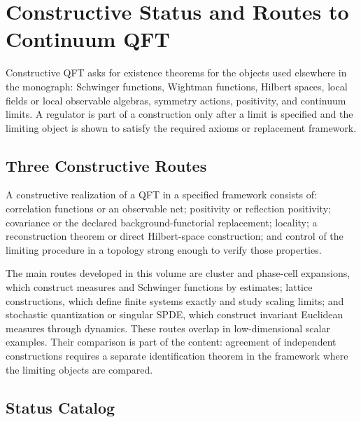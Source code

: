 \chapter{Constructive Status and Routes to Continuum QFT}
\label{ch:constructive-status-routes}

\ConventionsEuclidean

Constructive QFT asks for existence theorems for the objects used elsewhere in
the monograph: Schwinger functions, Wightman functions, Hilbert spaces, local
fields or local observable algebras, symmetry actions, positivity, and
continuum limits.  A regulator is part of a construction only after a limit is
specified and the limiting object is shown to satisfy the required axioms or
replacement framework.

\section{Three Constructive Routes}

\begin{definition}
\label{def:constructive-realization}
A constructive realization of a QFT in a specified framework consists of:
correlation functions or an observable net; positivity or reflection
positivity; covariance or the declared background-functorial replacement;
locality; a reconstruction theorem or direct Hilbert-space construction; and
control of the limiting procedure in a topology strong enough to verify those
properties.
\end{definition}

The main routes developed in this volume are cluster and phase-cell
expansions, which construct measures and Schwinger functions by estimates;
lattice constructions, which define finite systems exactly and study scaling
limits; and stochastic quantization or singular SPDE, which construct
invariant Euclidean measures through dynamics.
These routes overlap in low-dimensional scalar examples.  Their comparison is
part of the content: agreement of independent constructions requires a
separate identification theorem in the framework where the limiting objects
are compared.

\section{Status Catalog}


